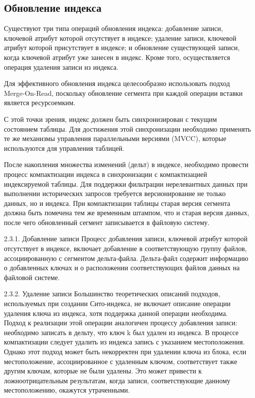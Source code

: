 \subsection{Обновление индекса}

Существуют три типа операций обновления индекса: добавление записи, ключевой атрибут которой отсутствует в индексе; удаление записи, ключевой атрибут которой присутствует в индексе; и обновление существующей записи, когда ключевой атрибут уже занесен в индекс. Кроме того, осуществляется операция удаления записи из индекса.

Для эффективного обновления индекса целесообразно использовать подход Merge-On-Read, поскольку обновление сегмента при каждой операции вставки является ресурсоемким.

С этой точки зрения, индекс должен быть синхронизирован с текущим состоянием таблицы. Для достижения этой синхронизации необходимо применять те же механизмы управления параллельными версиями (MVCC), которые используются для управления таблицей.

После накопления множества изменений (дельт) в индексе, необходимо провести процесс компактизации индекса в синхронизации с компактизацией индексируемой таблицы. Для поддержки фильтрации нерелевантных данных при выполнении исторических запросов требуется версионирование не только данных, но и индекса. При компактизации таблицы старая версия сегмента должна быть помечена тем же временным штампом, что и старая версия данных, после чего обновленный сегмент записывается в файловую систему.

2.3.1. Добавление записи
Процесс добавления записи, ключевой атрибут которой отсутствует в индексе, включает добавление в соответствующую группу файлов, ассоциированную с сегментом дельта-файла. Дельта-файл содержит информацию о добавленных ключах и о расположении соответствующих файлов данных на файловой системе.

2.3.2. Удаление записи
Большинство теоретических описаний подходов, используемых при создании Сито-индекса, не включает описание операции удаления ключа из индекса, хотя поддержка данной операции необходима. Подход к реализации этой операции аналогичен процессу добавления записи: необходимо записать в дельту, что ключ k был удален из индекса. В процессе компактизации следует удалить из индекса запись с указанием местоположения. Однако этот подход может быть некорректен при удалении ключа из блока, если местоположение, ассоциированное с удаленным ключом, соответствует также другим ключам, которые не были удалены. Это может привести к ложноотрицательным результатам, когда записи, соответствующие данному местоположению, окажутся утраченными.

